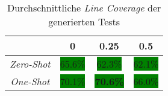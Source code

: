 \bgroup
\def\arraystretch{2}
\begin{table}[H]
	\vspace{.5cm}
	\centering		
	\begin{center}
		\begin{tabular}{|c||c|c|c|}
			\hline 
			& 0 & 0.25 & 0.5 \\
			\hline 
			\hline
			\textit{Zero-Shot} & \colorbox{green}{65.6\%} & \colorbox{green}{62.3\%} & \colorbox{green}{62.1\%} \\
			\hline
			\textit{One-Shot }& \colorbox{green}{70.1\%} & \colorbox{green}{\textbf{70.6\%}} & \colorbox{green}{66.0\%} \\
			\hline
		\end{tabular} 
	\end{center}
	\caption{Durchschnittliche \textit{Line Coverage} der generierten Tests}
	\label{fig:line-avg}
	\vspace{-.8cm}
\end{table}
\egroup